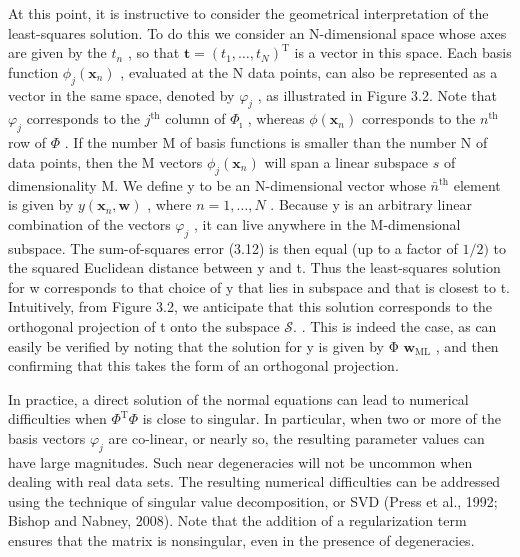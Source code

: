 \documentclass[
  10
]{article}
\begin{document}
At this point, it is instructive to consider the geometrical
interpretation of the least-squares solution. To do this we consider an
N-dimensional space whose axes are given by the \(t _ { n }\) , so that
\(\mathbf { t } = ( t _ { 1 } , \ldots , t _ { N } ) ^ { \mathrm { T } }\)
is a vector in this space. Each basis function
\(\phi _ { j } ( \mathbf { x } _ { n } )\) , evaluated at the N data
points, can also be represented as a vector in the same space, denoted
by \(\varphi _ { j }\) , as illustrated in Figure 3.2. Note that
\(\varphi _ { j }\) corresponds to the \(j ^ { \mathrm { t h } }\)
column of \(\Phi _ { \pmb { \imath } }\) , whereas
\(\phi (  { \mathbf { x } } _ { n } )\) corresponds to the
\(n ^ { \mathrm { t h } }\) row of \(\Phi\) . If the number M of basis
functions is smaller than the number N of data points, then the M
vectors \(\phi _ { j } (  { \mathbf { x } } _ { n } )\) will span a
linear subspace \(s\) of dimensionality M. We define y to be an
N-dimensional vector whose \(\bar { n } ^ { \mathrm { t h } }\) element
is given by \(y ( \mathbf { x } _ { n } , \mathbf { w } )\) , where
\(n = 1 , \ldots , N\) . Because y is an arbitrary linear combination of
the vectors \(\varphi _ { j }\) , it can live anywhere in the
M-dimensional subspace. The sum-of-squares error (3.12) is then equal
(up to a factor of \(1 / 2 )\) to the squared Euclidean distance between
y and t. Thus the least-squares solution for w corresponds to that
choice of y that lies in subspace and that is closest to t. Intuitively,
from Figure 3.2, we anticipate that this solution corresponds to the
orthogonal projection of t onto the subspace \({ \mathcal { S } } .\) .
This is indeed the case, as can easily be verified by noting that the
solution for y is given by Φ \(\mathbf { w } _ { \mathrm { M L } }\) ,
and then confirming that this takes the form of an orthogonal
projection.

In practice, a direct solution of the normal equations can lead to
numerical difficulties when \(\Phi ^ { \mathrm { T } } \Phi\) is close
to singular. In particular, when two or more of the basis vectors
\(\varphi _ { j }\) are co-linear, or nearly so, the resulting parameter
values can have large magnitudes. Such near degeneracies will not be
uncommon when dealing with real data sets. The resulting numerical
difficulties can be addressed using the technique of singular value
decomposition, or SVD (Press et al., 1992; Bishop and Nabney, 2008).
Note that the addition of a regularization term ensures that the matrix
is nonsingular, even in the presence of degeneracies.
\end{document}
